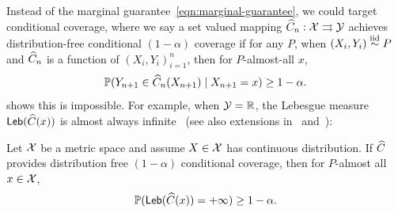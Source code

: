 \documentclass{article}
\begin{document}
Instead of the marginal guarantee~\eqref{eqn:marginal-guarantee}, we could
target conditional coverage, where we say a set valued mapping $\widehat{C}_n :
\mathcal{X} \rightrightarrows \mathcal{Y}$ achieves distribution-free conditional $(1 - \alpha)$
coverage if for any $P$, when $(X_i, Y_i) \stackrel{\rm iid}{\sim} P$ and $\widehat{C}_n$ is a
function of $(X_i, Y_i)_{i = 1}^n$, then for $P$-almost-all $x$,
\begin{equation}
  \label{eqn:x-conditional-coverage}
  \mathbb{P}(Y_{n + 1} \in \widehat{C}_n(X_{n + 1}) \mid X_{n + 1} = x) \ge 1 - \alpha.
\end{equation}
%
\citet{Vovk12} shows this is impossible.
%
For example, when $\mathcal{Y} = \mathbb{R}$, the Lebesgue measure
$\mathsf{Leb}(\widehat{C}(x))$ is almost always infinite~\cite[Proposition
  4]{Vovk12} (see also extensions in~\cite{BarberCaRaTi21a}
and~\cite[Corollary 7.1]{DuchiGuJiSu24}):
\begin{corollary}
  Let $\mathcal{X}$ be a metric space and assume $X \in \mathcal{X}$ has
  continuous distribution.
  If $\widehat{C}$ provides distribution free $(1 - \alpha)$ conditional
  coverage, then for $P$-almost all
  $x \in \mathcal{X}$,
  \begin{equation*}
    \mathbb{P}(\mathsf{Leb}(\widehat{C}(x)) = + \infty) \ge 1 - \alpha.
  \end{equation*}
\end{corollary}
\end{document}
